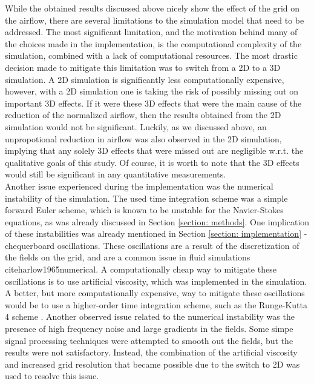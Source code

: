 
While the obtained results discussed above nicely show the effect of the grid on the airflow, there are several limitations to the simulation model that need to be addressed. The most significant limitation, and the motivation behind many of the choices made in the implementation, is the computational complexity of the simulation, combined with a lack of computational resources. The most drastic decision made to mitigate this limitation was to switch from a 2D to a 3D simulation. A 2D simulation is significantly less computationally expensive, however, with a 2D simulation one is taking the risk of possibly missing out on important 3D effects. If it were these 3D effects that were the main cause of the reduction of the normalized airflow, then the results obtained from the 2D simulation would not be significant. Luckily, as we discussed above, an unpropotional reduction in airflow was also observed in the 2D simulation, implying that any solely 3D effects that were missed out are negligible w.r.t. the qualitative goals of this study. Of course, it is worth to note that the 3D effects would still be significant in any quantitative measurements.  \\

Another issue experienced during the implementation was the numerical instability of the simulation. The used time integration scheme was a simple forward Euler scheme, which is known to be unstable for the Navier-Stokes equations, as was already discussed in Section \ref{section: methods}. One implication of these instabilities was already mentioned in Section \ref{section: implementation} - chequerboard oscillations. These oscillations are a result of the discretization of the fields on the grid, and are a common issue in fluid simulations cite{harlow1965numerical}. A computationally cheap way to mitigate these oscillations is to use artificial viscosity, which was implemented in the simulation. A better, but more computationally expensive, way to mitigate these oscillations would be to use a higher-order time integration scheme, such as the Runge-Kutta 4 scheme \cite{RungeKutta}. Another observed issue related to the numerical instability was the presence of high frequency noise and large gradients in the fields. Some simpe signal processing techniques were attempted to smooth out the fields, but the results were not satisfactory. Instead, the combination of the artificial viscosity and increased grid resolution that became possible due to the switch to 2D was used to resolve this issue. \\

